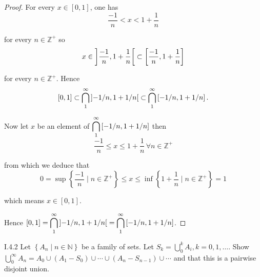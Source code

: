 \begin{proof}
	For every \( x \in [0, 1] \), one has
	\[
		\frac{-1}{n} < x < 1 + \frac{1}{n}
	\]

	for every \( n \in \mathbb{Z}^{+} \) so
	\[
		x \in \left\rbrack{\frac{-1}{n}, 1 + \frac{1}{n}}\right\lbrack \subset \left\lbrack{\frac{-1}{n}, 1 + \frac{1}{n}}\right\rbrack
	\]

	for every \( n \in \mathbb{Z}^{+} \). Hence
	\[
		[0, 1] \subset \bigcap^{\infty}_{1} \left\rbrack{-1/n, 1 + 1/n}\right\lbrack \subset \bigcap^{\infty}_{1} \left\lbrack{-1/n, 1 + 1/n}\right\rbrack.
	\]

	Now let \( x \) be an element of \( \displaystyle\bigcap^{\infty}_{1} \left\lbrack{-1/n, 1 + 1/n}\right\rbrack \) then
	\[
		\frac{-1}{n} \leq x \leq 1 + \frac{1}{n}\, \forall n \in \mathbb{Z}^{+}
	\]

	from which we deduce that
	\[
		0 = \sup\left\{ \frac{-1}{n} \mid n \in \mathbb{Z}^{+} \right\} \leq x \leq \inf\left\{ 1 + \frac{1}{n} \mid n \in \mathbb{Z}^{+} \right\} = 1
	\]

	which means \( x \in [0, 1] \).

	Hence \( [0, 1] = \displaystyle\bigcap^{\infty}_{1} \left\rbrack{-1/n, 1 + 1/n}\right\lbrack = \bigcap^{\infty}_{1} \left\lbrack{-1/n, 1 + 1/n}\right\rbrack \).
\end{proof}

\begin{problem}{I.4.2}
Let \( \left\{ A_{n} \mid n \in \mathbb{N} \right\} \) be a family of sets. Let \( S_{k} = \displaystyle\bigcup^{k}_{0} A_{i}, k = 0, 1, \ldots \). Show \( \displaystyle\bigcup^{\infty}_{0} A_{n} = A_{0} \cup (A_{1} - S_{0}) \cup \cdots \cup (A_{n} - S_{n-1}) \cup \cdots \) and that this is a pairwise disjoint union.
\end{problem}

